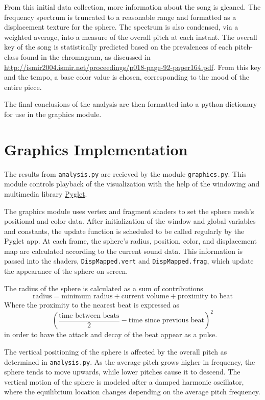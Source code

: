 \documentclass{article}
\newcommand{\code}{\texttt}
\begin{document}
From this initial data collection, more information about the song is gleaned. The frequency spectrum is truncated to a reasonable range and formatted as a displacement texture for the sphere. The spectrum is also condensed, via a weighted average, into a measure of the overall pitch at each instant. The overall key of the song is statistically predicted based on the prevalences of each pitch-class found in the chromagram, as discussed in \url{http://ismir2004.ismir.net/proceedings/p018-page-92-paper164.pdf}. From this key and the tempo, a base color value is chosen, corresponding to the mood of the entire piece.

The final conclusions of the analysis are then formatted into a python dictionary for use in the graphics module.

\section{Graphics Implementation}

The results from \code{analysis.py} are recieved by the module \code{graphics.py}. This module controls playback of the visualization with the help of the windowing and multimedia library \href{http://www.pyglet.org/}{Pyglet}.

The graphics module uses vertex and fragment shaders to set the sphere mesh's positional and color data. After initialization of the window and global variables and constants, the update function is scheduled to be called regularly by the Pyglet app. At each frame, the sphere's radius, position, color, and displacement map are calculated according to the current sound data. This information is passed into the shaders, \code{DispMapped.vert} and \code{DispMapped.frag}, which update the appearance of the sphere on screen.

The radius of the sphere is calculated as a sum of contributions
$$\text{radius} = \text{minimum radius} + \text{current volume} + \text{proximity to beat}$$
Where the proximity to the nearest beat is expressed as
$$\left( \frac{\text{time between beats}}{2} - \text{time since previous beat} \right)^2$$
in order to have the attack and decay of the beat appear as a pulse.

The vertical positioning of the sphere is affected by the overall pitch as determined in \code{analysis.py}. As the average pitch grows higher in frequency, the sphere tends to move upwards, while lower pitches cause it to descend. The vertical motion of the sphere is modeled after a damped harmonic oscillator, where the equilibrium location changes depending on the average pitch frequency.
\end{document}
